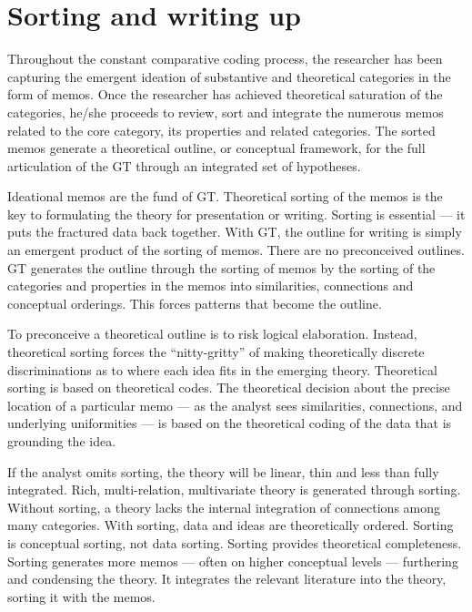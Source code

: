 \section*{Sorting and writing up}

Throughout the constant comparative coding process, 
the researcher has been capturing the emergent ideation of substantive and theoretical categories in the form of memos. 
Once the researcher has achieved theoretical saturation of the categories, 
he/she proceeds to review, 
sort and integrate the numerous memos related to the core category, 
its properties and related categories. 
The sorted memos generate a theoretical outline, 
or conceptual framework, 
for the full articulation of the GT through an integrated set of hypotheses.

Ideational memos are the fund of GT. Theoretical sorting of the memos is the
key to formulating the theory for presentation or writing. 
Sorting is essential 
--- it puts the fractured data back together. 
With GT, 
the outline for writing is simply an emergent product of the sorting of memos. 
There are no preconceived outlines. 
GT generates the outline through the sorting of memos by the sorting of the categories and properties in the memos into similarities, 
connections and conceptual orderings. 
This forces patterns that become the outline.

To preconceive a theoretical outline is to risk logical elaboration. Instead,
theoretical sorting forces the “nitty-gritty” of making theoretically discrete
discriminations as to where each idea fits in the emerging theory. Theoretical
sorting is based on theoretical codes. 
The theoretical decision about the precise location of a particular memo
--- as the analyst sees similarities, connections, and underlying uniformities
--- is based on the theoretical coding of the data that is grounding the idea.


If the analyst omits sorting, the theory will be linear, 
thin and less than fully integrated. 
Rich, multi-relation, multivariate theory is generated through sorting.
Without sorting, 
a theory lacks the internal integration of connections among many categories.
With sorting, data and ideas are theoretically ordered. 
Sorting is conceptual sorting, not data sorting. 
Sorting provides theoretical completeness. 
Sorting generates more memos
--- often on higher conceptual levels 
--- furthering and condensing the theory. 
It integrates the relevant literature into the theory, 
sorting it with the memos.

